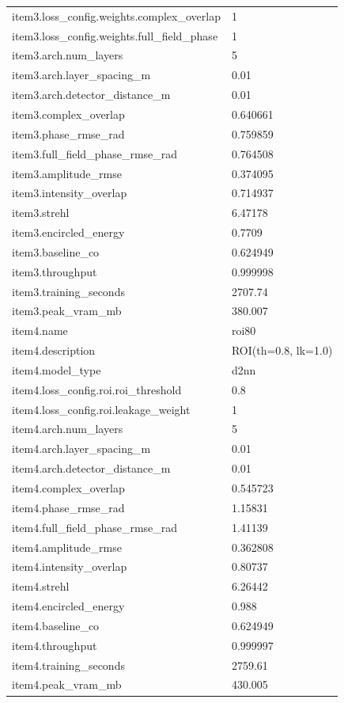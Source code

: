 \begin{longtable}{p{}p{}}
item3.loss\_config.weights.complex\_overlap & 1\\
item3.loss\_config.weights.full\_field\_phase & 1\\
item3.arch.num\_layers & 5\\
item3.arch.layer\_spacing\_m & 0.01\\
item3.arch.detector\_distance\_m & 0.01\\
item3.complex\_overlap & 0.640661\\
item3.phase\_rmse\_rad & 0.759859\\
item3.full\_field\_phase\_rmse\_rad & 0.764508\\
item3.amplitude\_rmse & 0.374095\\
item3.intensity\_overlap & 0.714937\\
item3.strehl & 6.47178\\
item3.encircled\_energy & 0.7709\\
item3.baseline\_co & 0.624949\\
item3.throughput & 0.999998\\
item3.training\_seconds & 2707.74\\
item3.peak\_vram\_mb & 380.007\\
item4.name & roi80\\
item4.description & ROI(th=0.8, lk=1.0)\\
item4.model\_type & d2nn\\
item4.loss\_config.roi.roi\_threshold & 0.8\\
item4.loss\_config.roi.leakage\_weight & 1\\
item4.arch.num\_layers & 5\\
item4.arch.layer\_spacing\_m & 0.01\\
item4.arch.detector\_distance\_m & 0.01\\
item4.complex\_overlap & 0.545723\\
item4.phase\_rmse\_rad & 1.15831\\
item4.full\_field\_phase\_rmse\_rad & 1.41139\\
item4.amplitude\_rmse & 0.362808\\
item4.intensity\_overlap & 0.80737\\
item4.strehl & 6.26442\\
item4.encircled\_energy & 0.988\\
item4.baseline\_co & 0.624949\\
item4.throughput & 0.999997\\
item4.training\_seconds & 2759.61\\
item4.peak\_vram\_mb & 430.005\\
\end{longtable}

